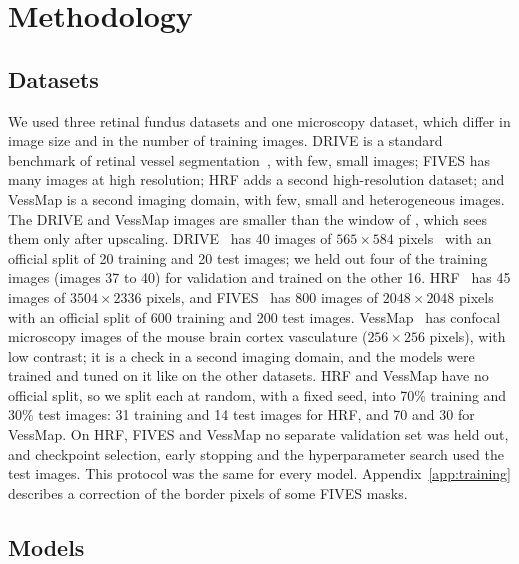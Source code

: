 \section{Methodology}
\label{sec:methodology}

\subsection{Datasets}
\label{subsec:method_problem_data}

We used three retinal fundus datasets and one microscopy dataset, which differ in image size and in the number of training images. DRIVE is a standard benchmark of retinal vessel segmentation~\cite{moccia2018blood}, with few, small images; FIVES has many images at high resolution; HRF adds a second high-resolution dataset; and VessMap is a second imaging domain, with few, small and heterogeneous images. The DRIVE and VessMap images are smaller than the window of \medsam{}, which sees them only after upscaling. DRIVE~\cite{Staal2004} has 40 images of $565 \times 584$ pixels~\cite{galdran2020littlewnetcouldstateoftheart} with an official split of 20 training and 20 test images; we held out four of the training images (images 37 to 40) for validation and trained on the other 16. HRF~\cite{budai2013robust} has 45 images of $3504 \times 2336$ pixels, and FIVES~\cite{jin2022fives} has 800 images of $2048 \times 2048$ pixels with an official split of 600 training and 200 test images. VessMap~\cite{viana2025new} has confocal microscopy images of the mouse brain cortex vasculature ($256 \times 256$ pixels), with low contrast; it is a check in a second imaging domain, and the models were trained and tuned on it like on the other datasets. HRF and VessMap have no official split, so we split each at random, with a fixed seed, into 70\% training and 30\% test images: 31 training and 14 test images for HRF, and 70 and 30 for VessMap. On HRF, FIVES and VessMap no separate validation set was held out, and checkpoint selection, early stopping and the hyperparameter search used the test images. This protocol was the same for every model. Appendix~\ref{app:training} describes a correction of the border pixels of some FIVES masks.

\subsection{Models}
\label{subsec:method_models}
\label{subsec:method_matrix}

